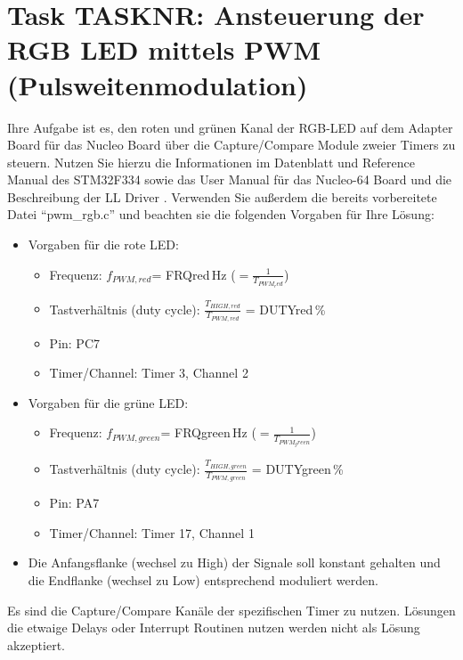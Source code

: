 \documentclass[a4paper,12pt]{article}
\begin{document}
\pagestyle{empty}
\setlength{\parindent}{0em}
\section*{Task {{TASKNR}}: Ansteuerung der RGB LED mittels PWM (Pulsweitenmodulation)}

Ihre Aufgabe ist es, den roten und grünen Kanal der RGB-LED auf dem Adapter Board für das Nucleo Board über die Capture/Compare Module zweier Timers zu steuern. Nutzen Sie hierzu die Informationen im Datenblatt \cite{data_sheet} und Reference Manual \cite{ref_manual} des STM32F334 sowie das User Manual für das Nucleo-64 Board \cite{nucleo_manual} und die Beschreibung der LL Driver \cite{driver_manual}. Verwenden Sie außerdem die bereits vorbereitete Datei \enquote{pwm\_rgb.c} und beachten sie die folgenden Vorgaben für Ihre Lösung:

\begin{itemize}
\item Vorgaben für die rote LED:
\begin{itemize}
    \item Frequenz: $f_{PWM, red}$= {{FRQred}}\,Hz ($=\frac{1}{T_{PWM_red}}$)
\item Tastverh\"altnis (duty cycle):  $\frac{T_{HIGH,red}}{T_{PWM,red}}$ = {{DUTYred}}\,\%
\item Pin: PC7
\item Timer/Channel: Timer 3, Channel 2
\end{itemize}
\item  Vorgaben für die grüne LED:
\begin{itemize}
    \item Frequenz: $f_{PWM, green}$= {{FRQgreen}}\,Hz ($=\frac{1}{T_{PWM_green}}$)
\item Tastverh\"altnis (duty cycle):  $\frac{T_{HIGH,green}}{T_{PWM,green}}$ = {{DUTYgreen}}\,\%
\item Pin: PA7
\item Timer/Channel: Timer 17, Channel 1
\end{itemize}
\item Die Anfangsflanke (wechsel zu High) der Signale soll konstant gehalten und die Endflanke (wechsel zu Low) entsprechend moduliert werden.
\end{itemize}
\vspace{0.3cm}

Es sind die Capture/Compare Kanäle der spezifischen Timer zu nutzen. Lösungen die etwaige Delays oder Interrupt Routinen nutzen werden nicht als Lösung akzeptiert.
\\
\end{document}
